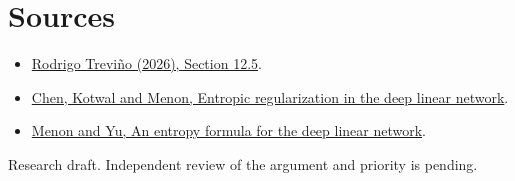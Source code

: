 \documentclass[10pt]{article}
\begin{document}
\section*{Sources}
\begin{itemize}
\item \href{https://arxiv.org/abs/2610.05551}{Rodrigo Treviño (2026), Section 12.5}.
\item \href{https://arxiv.org/abs/2512.06137}{Chen, Kotwal and Menon, Entropic regularization in the deep linear network}.
\item \href{https://arxiv.org/abs/2509.09088}{Menon and Yu, An entropy formula for the deep linear network}.
\end{itemize}
{\small Research draft. Independent review of the argument and priority is pending.}
\end{document}
